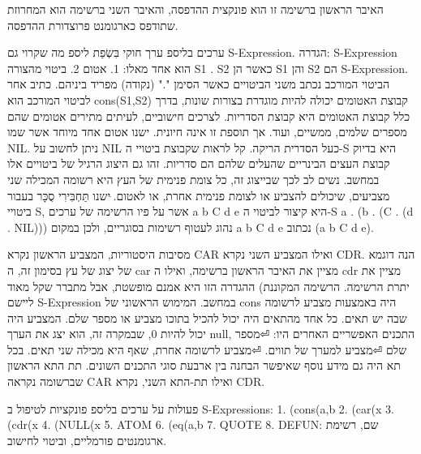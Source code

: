 \begin{טבלא}[!htbp]
      האיבר הראשון ברשימה זו הוא פונקצית ההדפסה, והאיבר השני ברשימה הוא המחרוזת
      שתודפס כארגומנט פרוצדורת ההדפסה.

      ערכים בליספ
      ערך חוקי בִּשְׂפַת ליספ מה שקרוי גם S-Expression.
      הגדרה: S-Expression הוא אחד מאלו:
      1. אטום
      2. ביטוי מהצורה S1 . S2 כאשר הן S1 והן S2 הם
      S-Expression. הביטוי המורכב נכתב משני הביטויים
      כאשר הסימן "." (נקודה) מפריד ביניהם. כתיב אחר
      לביטוי המורכב הוא cons(S1,S2) קבוצת האטומים
      יכולה להיות מוגדרת בצורות שונות, בדרך כלל
      קבוצת האטומים היא קבוצת הסדריות. לצרכים
      חישוביים, לעיתים מתירים אטומים שהם מספרים
      שלמים, ממשיים, ועוד. אך תוספת זו אינה חיונית.
      ישנו אטום אחד מיוחד אשר שמו NIL. ניתן לחשוב על
      NIL כעל הסדרית הריקה.
      קל לראות שקבוצת ביטויי ה-S היא בדיוק קבוצת העצים הבינריים שהעלים שלהם הם סדריות. זהו גם היצוג הרגיל של ביטויים אלו במחשב. נשים לב לכך שבייצוג זה, כל צומת פנימית של העץ היא רשומה המכילה שני מצביעים, שיכולים להצביע או לצומת פנימית אחרת, או לאטום.
      ּישנו תַּחְבִּירִי סֻכָּר בעבור ביטויי S, אשר על פיו הרשימה של ערכים a b C d e היא קיצור לביטוי ה-S
      a . (b . (C . (d . NIL)))
      נהוג לעטוף רשימות בסוגריים, ולכן במקום a b C d e נכתוב (a b C d e).

      מסיבות היסטוריות, המצביע הראשון נקרא CAR ואילו המצביע השני נקרא CDR. הנה דוגמא
      של יצוג של עץ בסימון זה, ה car מציין את האיבר הראשון ברשימה, ואילו ה cdr מציין
      את יתרת הרשימה. הרשימה המקוננת)
      ההגדרה הזו היא אמנם מופשטת, אבל מתברר שקל מאוד ליישם S-Expression במחשב. המימוש הראשוני של cons היה באמצעות מצביע לרשומה שבה יש תאים. כל אחד מהתאים היה יכול להכיל בתוכו מצביע או מספר שלם. המצביע היה יכול להיות 0, שבמקרה זה, הוא יצג את הערך null,
      התכנים האפשריים האחרים היו:
⏎מספר שלם
⏎מצביע למערך של תווים.
⏎מצביע לרשומה אחרת, שאף היא מכילה שני תאים.
      בכל תא היה גם מידע נוסף שאיפשר הבחנה בין ארבעת סוגי התכנים השונים.
      תת התא הראשון שברשומה נקראה CAR ואילו תת-התא השני, נקרא CDR.

      פעולות על ערכים בליספ
      פונקציות לטיפול ב S-Expressions:
      1. (cons(a,b
      2. (car(x
      3. (cdr(x
      4. (NULL(x
      5. ATOM
      6. (eq(a,b
      7. QUOTE
      8. DEFUN: שם, רשימת ארגומנטים פורמליים, וביטוי לחישוב.


\end{טבלא}
